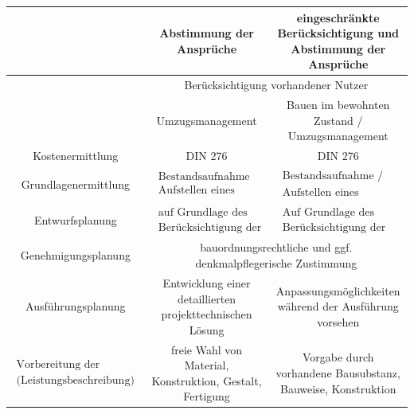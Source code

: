\documentclass[fleqn,twoside,dvipsnames]{article}
\begin{document}
\begin{itemize}
{\begin{tabular}{|c|c|c|}
                \hline & Abstimmung der Ansprüche & eingeschränkte Berücksichtigung und Abstimmung der Ansprüche \\
                \hline & \multicolumn{2}{c|}{ Berücksichtigung vorhandener Nutzer } \\
                \hline & Umzugsmanagement & Bauen im bewohnten Zustand / Umzugsmanagement \\
                \hline Kostenermittlung & DIN 276 & DIN 276 \\
                \hline Grundlagenermittlung & $\begin{array}{c}\text { Bestandsaufnahme } \\
                \text { Aufstellen eines planungsbezogenen Zielkonzeptes (Planungskonzept) }\end{array}$ & $\begin{array}{c}\text { Bestandsaufnahme / Bauzustandsanalyse } \\
                \text { Aufstellen eines planungsbezogenen Zielkonzeptes (Planungskonzept) }\end{array}$ \\
                \hline Entwurfsplanung & $\begin{array}{l}\text { auf Grundlage des Planungskonzeptes } \\
                \text { Berücksichtigung der o.g. Randbedingungen }\end{array}$ & $\begin{array}{l}\text { Auf Grundlage des Planungskonzeptes } \\
                \text { Berücksichtigung der o.g. Randbedingungen }\end{array}$ \\
                \hline Genehmigungsplanung & \multicolumn{2}{c|}{ bauordnungsrechtliche und ggf. denkmalpflegerische Zustimmung } \\
                \hline Ausführungsplanung & Entwicklung einer detaillierten projekttechnischen Lösung & Anpassungsmöglichkeiten während der Ausführung vorsehen \\
                \hline $\begin{array}{c}\text {Vorbereitung der Vergabe}\\ \text{(Leistungsbeschreibung)}\end{array}$ & freie Wahl von Material, Konstruktion, Gestalt, Fertigung & Vorgabe durch vorhandene Bausubstanz, Bauweise, Konstruktion \\
                \hline
                \end{tabular}}
    \end{itemize}
\end{document}
